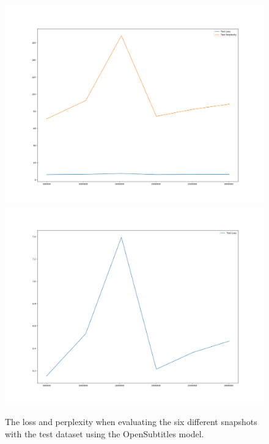 \begin{figure}[H]
	\includegraphics[width=\linewidth]{img/plots/opensubtitles_not_reversed/test_metrics_both.png}
	\centering
	\small
	\endminipage\hfill
	\includegraphics[width=\linewidth]{img/plots/opensubtitles_not_reversed/test_metrics_loss.png}
	\centering
	\small
	\endminipage\hfill
	\caption{The loss and perplexity when evaluating the six different snapshots with the test dataset using the OpenSubtitles model.}
	\label{result:test_performance:opensubtitles}
\end{figure}

